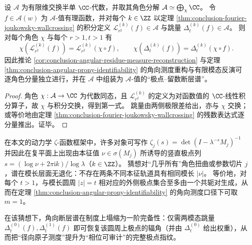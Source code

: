 \begin{proposition}[与有限维交换半单通道的角色分解相容]\label{prop:conclusion-fourier-joukowsky-character-compatibility}
设 \(\mathcal A\) 为有限维交换半单 \(\CC\)-代数，并取其角色分解 \(\mathcal A\simeq\bigoplus_{\chi}\CC\)。
令 \(f\in \mathcal A(w)\) 为 \(\mathcal A\)-值有理函数，并对每个 \(k\in\ZZ\) 以定理 \ref{thm:conclusion-fourier-joukowsky-wallcrossing} 的积分定义 \(\mathcal L_{r^2}^{(k)}(f)\in\mathcal A\) 与跳量 \(\Delta_t^{(k)}(f)\in\mathcal A\)。
则对每个角色 \(\chi\) 与每个 \(r>1,t>1\) 有
\[
\chi\!\left(\mathcal L_{r^2}^{(k)}(f)\right)=\mathcal L_{r^2}^{(k)}(\chi\circ f),
\qquad
\chi\!\left(\Delta_t^{(k)}(f)\right)=\Delta_t^{(k)}(\chi\circ f).
\]
因此推论 \ref{cor:conclusion-angular-residue-measure-reconstruction} 与定理 \ref{thm:conclusion-angular-prony-identifiability} 的角向测度重构与有限模态反演可逐角色分量独立进行，并在 \(\mathcal A\) 中组装为 \(\mathcal A\)-值的“极点--留数断层谱”。
\end{proposition}
\begin{proof}
角色 \(\chi:\mathcal A\to\CC\) 为代数同态，且 \(\mathcal L_{r^2}^{(k)}\) 的定义为对函数值的 \(\CC\)-线性积分算子，故 \(\chi\) 与积分交换，得到第一式。
跳量由两侧极限差给出，亦与 \(\chi\) 交换；或等价地由定理 \ref{thm:conclusion-fourier-joukowsky-wallcrossing} 的残数表达式逐分量推出。证毕。
\end{proof}

\begin{conjecture}[单占据极点圆与一阶模态完备性]\label{conj:conclusion-single-occupied-pole-circle-first-order-completeness}
在本文的动力学 \(\zeta\)-函数框架中，许多对象可写作
\(
\zeta_j(s)=\det(I-\lambda^{-s}M_j)^{-1}
\)
并因此在复平面上出现由本征值 \(\nu\in\sigma(M_j)\) 所诱导的竖直极点列
\(
s=(\log\nu+2\pi\mathrm{i}k)/\log\lambda
\)（\(k\in\ZZ\)）。
猜想对“几乎所有”角色扭曲或参数切片 \(j\)，谱在模长层面无退化：不存在两条不同本征轨道具有相同模长 \(|\nu|\)。
等价地，对每个 \(t>1\)，与模长圆周 \(|z|=t\) 相对应的外侧极点集合至多由一个共轭对生成，从而在定理 \ref{thm:conclusion-angular-prony-identifiability} 的角向测度口径下可取 \(m=1\)。
\par
在该猜想下，角向断层谱在制度上塌缩为一阶完备性：仅需两模态跳量 \(\Delta_t^{(0)}(f),\Delta_t^{(1)}(f)\) 即可恢复该圆周上极点的辐角（并由 \(\Delta_t^{(0)}\) 给出权重），从而把“径向原子测度”提升为“相位可审计”的完整极点指纹。
\end{conjecture}

\endinput

